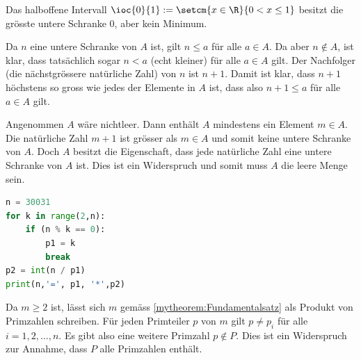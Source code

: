 \clearpage
\begin{myanswer}[myexercise:0298]
	Das halboffene Intervall $\ioc{0}{1} := \setcm{x\in\R}{0<x\leq 1}$ besitzt die grösste untere Schranke $0$, aber kein Minimum.
\end{myanswer}

\begin{myanswer}[myexercise:0297]
	\begin{aenum}
		\item Da $n$ eine untere Schranke von $A$ ist, gilt $n\leq a$ für alle $a\in A$.
		Da aber $n\notin A$, ist klar, dass tatsächlich sogar $n < a$ (echt kleiner) für alle $a\in A$ gilt.
		Der Nachfolger (die nächstgrössere natürliche Zahl) von $n$ ist $n+1$.
		Damit ist klar, dass $n+1$ höchstens so gross wie jedes der Elemente in $A$ ist, dass also $n+1 \leq a$ für alle $a\in A$ gilt.
		\item Angenommen $A$ wäre nichtleer.
		Dann enthält $A$ mindestens ein Element $m\in A$.
		Die natürliche Zahl $m+1$ ist grösser als $m\in A$ und somit keine untere Schranke von $A$.
		Doch $A$ besitzt die Eigenschaft, dass jede natürliche Zahl eine untere Schranke von $A$ ist.
		Dies ist ein Widerspruch und somit muss $A$ die leere Menge sein.
	\end{aenum}
\end{myanswer}
\begin{myanswer}[myexercise:0293]
	\begin{lstlisting}[language=Python]
n = 30031
for k in range(2,n):
    if (n % k == 0):
        p1 = k
        break
p2 = int(n / p1)
print(n,'=', p1, '*',p2)
\end{lstlisting}
\end{myanswer}

\begin{myanswer}[myexercise:0292]
	Da $m\geq 2$ ist, lässt sich $m$ gemäss \cref{mytheorem:Fundamentalsatz} als Produkt von Primzahlen schreiben. Für jeden Primteiler $p$ von $m$ gilt $p\neq p_i$ für alle $i=1,2,\ldots , n$. Es gibt also eine weitere Primzahl $p\notin P$. Dies ist ein Widerspruch zur Annahme, dass $P$ alle Primzahlen enthält.
\end{myanswer}

